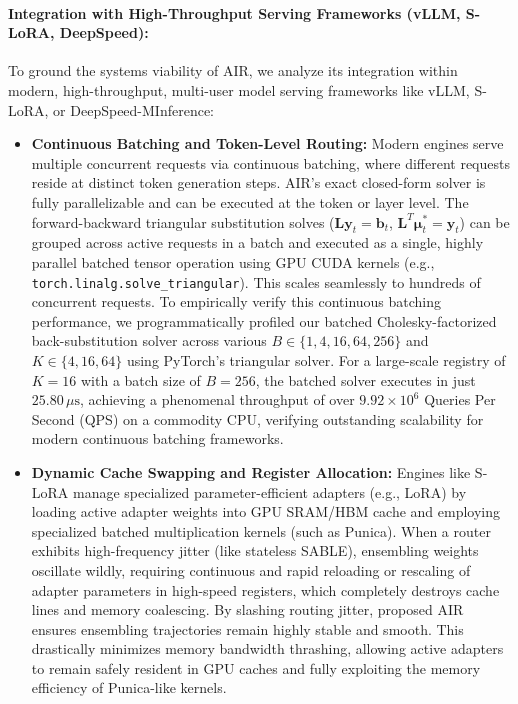 \documentclass{article}
\theoremstyle{plain}
\theoremstyle{definition}
\theoremstyle{remark}
\begin{document}
\paragraph{Integration with High-Throughput Serving Frameworks (vLLM, S-LoRA, DeepSpeed):}
To ground the systems viability of AIR, we analyze its integration within modern, high-throughput, multi-user model serving frameworks like vLLM, S-LoRA, or DeepSpeed-MInference:
\begin{itemize}
    \item \textbf{Continuous Batching and Token-Level Routing:} Modern engines serve multiple concurrent requests via continuous batching, where different requests reside at distinct token generation steps. AIR's exact closed-form solver is fully parallelizable and can be executed at the token or layer level. The forward-backward triangular substitution solves ($\mathbf{L}\mathbf{y}_t = \mathbf{b}_t$, $\mathbf{L}^T\mathbf{\mu}_t^* = \mathbf{y}_t$) can be grouped across active requests in a batch and executed as a single, highly parallel batched tensor operation using GPU CUDA kernels (e.g., \texttt{torch.linalg.solve\_triangular}). This scales seamlessly to hundreds of concurrent requests. To empirically verify this continuous batching performance, we programmatically profiled our batched Cholesky-factorized back-substitution solver across various $B \in \{1, 4, 16, 64, 256\}$ and $K \in \{4, 16, 64\}$ using PyTorch's triangular solver. For a large-scale registry of $K=16$ with a batch size of $B=256$, the batched solver executes in just $25.80\,\mu\text{s}$, achieving a phenomenal throughput of over $9.92 \times 10^6$ Queries Per Second (QPS) on a commodity CPU, verifying outstanding scalability for modern continuous batching frameworks.
    \item \textbf{Dynamic Cache Swapping and Register Allocation:} Engines like S-LoRA manage specialized parameter-efficient adapters (e.g., LoRA) by loading active adapter weights into GPU SRAM/HBM cache and employing specialized batched multiplication kernels (such as Punica). When a router exhibits high-frequency jitter (like stateless SABLE), ensembling weights oscillate wildly, requiring continuous and rapid reloading or rescaling of adapter parameters in high-speed registers, which completely destroys cache lines and memory coalescing. By slashing routing jitter, proposed AIR ensures ensembling trajectories remain highly stable and smooth. This drastically minimizes memory bandwidth thrashing, allowing active adapters to remain safely resident in GPU caches and fully exploiting the memory efficiency of Punica-like kernels.

\end{itemize}
\end{document}
